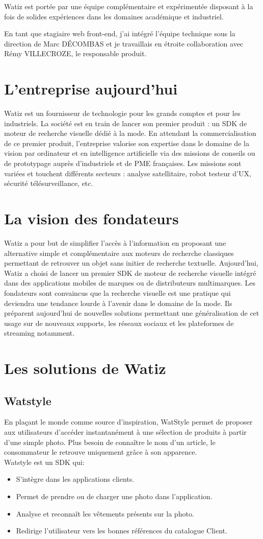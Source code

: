 \documentclass[a4paper, 12pt]{report}
\begin{document}
Watiz est portée par une équipe complémentaire et expérimentée disposant à la fois de solides expériences dans les domaines académique et industriel.
  
En tant que stagiaire web front-end, j’ai intégré l’équipe technique sous la direction de Marc DÉCOMBAS et je travaillais en étroite collaboration avec  Rémy VILLECROZE, le responsable produit. 
\section{L’entreprise aujourd’hui}
Watiz est un fournisseur de technologie pour les grands comptes et pour les industriels.
La société est en train de lancer son premier produit : un SDK de moteur de recherche visuelle dédié à la mode.
En attendant la commercialisation de ce premier produit, l’entreprise valorise son expertise dans le domaine de la vision par ordinateur et en intelligence artificielle via des missions de conseils ou de prototypage auprès d’industriels et de PME françaises. Les missions sont variées et touchent différents secteurs : analyse satellitaire, robot testeur d’UX, sécurité télésurveillance, etc.

\section{La vision des fondateurs}
Watiz a pour but de simplifier l’accès à l’information en proposant une alternative simple et complémentaire aux moteurs de recherche classiques permettant de retrouver un objet sans initier de recherche textuelle.
Aujourd’hui, Watiz a choisi de lancer un premier SDK de moteur de recherche visuelle intégré dans des applications mobiles de marques ou de distributeurs multimarques.
Les fondateurs sont convaincus que la recherche visuelle est une pratique qui deviendra une tendance lourde à l’avenir dans le domaine de la mode. Ils préparent aujourd’hui de nouvelles solutions permettant une généralisation de cet usage sur de nouveaux supports, les réseaux sociaux et les plateformes de streaming notamment.
\section{Les solutions de Watiz}
\subsection{Watstyle}
En plaçant le monde comme source d'inspiration, WatStyle permet de proposer aux utilisateurs d’accéder instantanément à une sélection de produits à partir d’une simple photo. Plus besoin de connaître le nom d’un article, le consommateur le retrouve uniquement grâce à son apparence.\\
Watstyle est un SDK qui:
\begin{itemize}
\item S'intègre dans les applications clients.
\item Permet de prendre ou de charger une photo dans l’application.
\item Analyse et reconnaît les vêtements présents sur la photo.
\item Redirige l’utilisateur  vers les bonnes références du catalogue Client.
\end{itemize}
\end{document}

